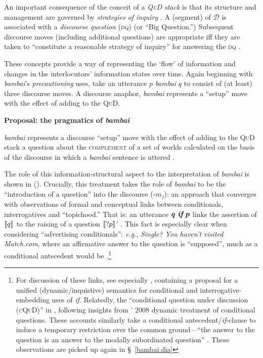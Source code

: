 \noindent An important consequence of the conceit of a \textit{\textsc{QuD} stack} is that its structure and management are governed by \textit{strategies of inquiry} \citep{Roberts1998,Roberts2004,Roberts2012}. A (segment) of $ \mathcal D $ is associated with a \textit{discourse question} \textsc{(dq)} (or ``Big Question.'') Subsequent discourse moves (including additional questions) are appropriate iff they are taken to ``constitute a reasonable strategy of inquiry'' for answering the \textsc{dq} \citep*{Simons2017}.

These concepts provide a way of representing the `flow' of information and changes in the interlocutors' information states over time. Again beginning with \textit{bambai}'s \textit{precautioning} uses, take an utterance $ p $ \textit{bambai} $ q $ to consist of (at least) three discourse moves. A discourse anaphor, \textit{bambai} represents a ``setup'' move with the effect of adding to the \textsc{QuD}. 

\ex \textbf{Proposal: the pragmatics of \emph{bambai}}

\textit{bambai} represents a discourse ``setup'' move with the effect of adding to the \textsc{QuD} stack a question about the \textsc{complement} of a set of worlds calculated on the basis of the discourse in which a \textit{bambai} sentence is uttered	.\xe

\noindent The role of this information-structural aspect to the interpretation of \textit{bambai} is shown in (). Crucially, this treatment takes the role of \textit{bambai} to be the ``introduction of a question'' into the discourse (-$m_j$): an approach that converges with observations of formal and conceptual links between conditionals, interrogatives and ``topichood.'' That is: an utterance $\boldsymbol{ q\textit{ \textbf{if} }p }$ links the assertion of $ \llbracket{q}\rrbracket^{} $ to the raising of a question $\llbracket{ ?p}\rrbracket^{} $' \citep[36]{Starr2010}. This fact is especially clear when considering ``advertising conditionals'': \textit{e.g.}, \textit{Single? You haven't visited Match.com}, where an affirmative answer to the question is ``supposed'', much as a conditional antecedent would be \citep[4]{Starr2014a}.\footnote{For discussion of these links, see especially \citet{Starr2010,Starr2011,Starr2014a}, containing a proposal for a unified (dynamic/inquistive) semantics for conditional and interrogative-embedding uses of \textit{if}. Relatedly, the ``conditional question under discussion (\textsc{cQuD})'' in \citealp{Ippolito2013a}, following insights from \citeauthor{Isaacs2008}' 2008 dynamic treatment of conditional questions. These accounts similarly take a conditional antecedent/\textit{if}-clause to induce a temporary restriction over the common ground---``the answer to the question is an answer to the modally subordinated question'' \citep[200]{Ippolito2013a}. These observations are picked up again in \S~\ref{bambai.dia}}

